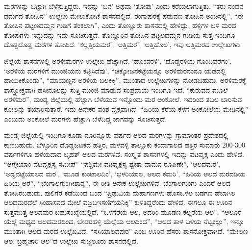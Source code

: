 ಮರಗಳನ್ನು ಒಟ್ಟಾಗಿ ಬೆಳೆಸುತ್ತಿದ್ದರು, ಇದನ್ನು ‘ಬನ’ ಅಥವಾ ‘ತೋಪು’ ಎಂದು ಕರೆಯಲಾಗುತ್ತಿತು. “ತರು ನಂದನ ಧರ್ಮದ ತೋಪಿನ” ಉಲ್ಲೇಖ ಮೇಲುಕೋಟೆ ಶಾಸನದಲ್ಲಿದೆ. ರಂಗಾಪುರಕ್ಕೆ ಪಡುವಣ ತೋಪಿನ ಅಂಚಿನಲ್ಲಿ”, “ಈ ತೋಪಿನ ಪಟ್ಟಣದಮ್ಮನ ಗುಡಿಗೆ ತೆಂಕಲಾಗಿ”, ಎಂದು ತೊಣ್ಣೂರು ಶಾಸನದಲ್ಲಿ ಹೇಳಿದ್ದು, ಹಳ್ಳಿಗಳ ಬಳಿ ಮರದ ತೋಪುಗಳು ಇದ್ದುದನ್ನು ಇದು ಸೂಚಿಸುತ್ತದೆ. ತೊಣ್ಣೂರಿನ ತೋಪಿನ ಪಟ್ಟಲದಮ್ಮನ ಗುಡಿಯ ಸುತ್ತ ಇಂದಿಗೂ ದೊಡ್ಡದೊಡ್ಡ ಮರಗಳ ತೋಪಿದೆ. ‘ಕಲ್ಲತ್ತಿಯಮರ’, ‘ಅತ್ತಿಮರ’, ‘ಅತ್ತಿಹೊಲ’, ಇವು ಅತ್ತಿಮರದ ಉಲ್ಲೇಖಗಳು.

ಜಿಲ್ಲೆಯ ಶಾಸನಗಳಲ್ಲಿ ಅರಳೀಮರಗಳ ಉಲ್ಲೇಖ ಹೆಚ್ಚಾಗಿದೆ. ‘ಹೊಂನರಳಿ’, ‘ದೊಡ್ಡರಳಿಯ ಗೊಂದಿವರೆಗಂ’, ‘ಅರಳಿಯ ಮರಗಳಿಗೆ ಮುಂಜಿಯನು ಕಟ್ಟಿಸಿದೆವು’, “ಚಿಕ್ಕೋಜನಕಟ್ಟೆಯನ್ನೂ ಅರಳಿಮರನಂನೂ ಯೆಡದಲ್ಲಿ ಹಾಯಿಕಿಕೊಂಡು”, “ಮಾಯಣ್ಣನ ಅರಳಿಯ ಬಲಕಿಕ್ಕಿ”, ಮುಂತಾದ ಉಲ್ಲೇಖಗಳನ್ನು ನೋಡಬಹುದು. ಅರಳಿಮರಕ್ಕೆ ಶಾಸ್ತ್ರೋಕ್ತವಾಗಿ ಹಸೀನೂಲನ್ನು ಸುತ್ತಿ ಮುಂಜಿ ಮಾಡುವ ಸಂಪ್ರದಾಯ ಇಂದಿಗೂ ಇದೆ. “ಕುರುವದ ಮೂಲೆ ಅರಳಿಮರ”, ಮಂಡ್ಯ ಜಿಲ್ಲೆಯಲ್ಲಿ ಹೆಚ್ಚಾಗಿ ಬೆಳೆಯುವ ಇನ್ನೊಂದು ಮರ ಅಂಕೋಲೆ. ಇದರಿಂದ ತಬಲ ಬಾರಿಸುವ ಕೋಲನ್ನು ತಯಾರಿಸುತ್ತಾರೆ. ಇದು ಅನೇಕರ ವಂಶ ವೃಕ್ಷವಾಗಿದೆ. “ಹಿರಿಯ ಕೆರೆಯ ಕೆಳಗೆ ಅಂಕೋಲೆಯ ಮೇಡಿ\-ನಲ್ಲಿ” ಎಂಬುದು ಅಂಕೋಲೆ ಮರಗಳು ಹೆಚ್ಚಾಗಿ ಬೆಳೆದಿದ್ದ ಜಾಗವನ್ನು ಸೂಚಿಸುತ್ತದೆ.

ಮಂಡ್ಯ ಜಿಲ್ಲೆಯಲ್ಲಿ ಇಂದಿಗೂ ಕೂಡಾ ನೂರಿನ್ನೂರು ವರ್ಷದ ಆಲದ ಮರಗಳನ್ನು ಗ್ರಾಮಾಂತರ ಪ್ರದೇಶದಲ್ಲಿ ಕಾಣಬಹುದು. ಬೆಳ್ಳೂರಿನ ದೊಡ್ಡಜಟಕದ ಹತ್ತಿರ, ಮಳವಳ್ಳಿ ತಾಲ್ಲೂಕು ಕಂದಾಗಾಲದ ಹತ್ತಿರ ಸುಮಾರು 200-300 ವರ್ಷಗಳಿಗೂ ಹಳೆಯದಾದ ಬೃಹತ್​ ಆಲದ ಮರಗಳಿವೆ. ಸಂಸ್ಕೃತ ಶಾಸನಗಳಲ್ಲಿ ಇದನ್ನು ವಟವೃಕ್ಷ ಎಂದು ಹೇಳಿದೆ. “ಆಗ್ನೇಯಾಂ ವಟವೃಕ್ಷಸ್ಯ ಸಮೀಪೆ” “ಪಶ್ಚಿಮೇ ವಟವೃಕ್ಷಸ್ಯ ಶ್ವೇತಾ ವಾಮನ ರೂಪಿಣೇ”, ‘ಆಲದಮರ’, ‘ಅಡ್ಡವಟ್ಟೆಯಾಲದ ಮರ’, ‘ಮೂಡ ಕುಂಟಾಲದಿಂ’, ‘ಭಳರಿಯಾಲ, ಆಲದ ಕಮರಿ’, “ಹಿರಿಯ ಆಲದ ಮರದಡಿಯ ಹಿರಿಯ ಅರೆ”, “ಬೆಂಗಾಲಗುಂಗೀಶಾನ್ಯ”, ಈ ರೀತಿ ಅನೇಕ ಉಲ್ಲೇಖಗಳಿವೆ. ಬೆಂಗಾಲಗುಂಗು ಎಂದರೆ ಆಲದ ತೋಪಿರಬಹುದು. ಪುಲಿಗೆರೆ ಕಡೆಯಿಂದ ಬಂದ “ಪ್ರಿಥುವಿಯ ಮಹಾಗಣಗಳು ಹೊಸಒಳಲ ಬಡಗಣ ಹೆಬಾಗಿಲ ಆಲದಮರದೆಲೆ ಸಿಂಹಾಸನದ ಮೇಲೆ ವಜ್ರಬಇಸಣಿಗೆಯನಿಕ್ಕಿ” ಕುಳಿತಿದ್ದರೆಂದು ಹೇಳಿದೆ. ಈಗಲೂ ಈ ಊರಿನ ಸುತ್ತಮುತ್ತ ಆಲದಮರ ಬಹುಸಂಖ್ಯೆಯಲ್ಲಿದೆ. “ಒಳಗೆರೆಯ ಆಲ, ಅದರಿಂ ಮೂಡಣ ಕಲ್ಲರೆಯ ಆಲ”, “ಆಲೂರ ಯೆಲ್ಲೆ ಮಧ್ಯದ ಆಲದಮರದಿಂದ, ಬೇಡರಹಳ್ಳಿ ಯೆಲ್ಲೆಯ ಆಲದಿಂದ”, “ಆಲದ ತಾಳ ಬಳಿಯ ನೆಟ್ಟಕಲ್ಲು”, ಇನ್ನೂ ಮುಂತಾಗಿ ಆಲದ ಮರದ ಉಲ್ಲೆಖವಿದೆ. “ಸಸಿಯಾಲದಪುರ” ಎಂಬ ಊರಿನ ಹೆಸರು ಶಾಸನೋಕ್ತವಾಗಿದೆ. “ಮೇಲಣ ಆಲ, ಬ್ರಹ್ಮಚಾರಿ ಆಲ”ದ ಉಲ್ಲೇಖ ಸುಜ್ಜಲೂರು ಶಾಸನದಲ್ಲಿದೆ.


